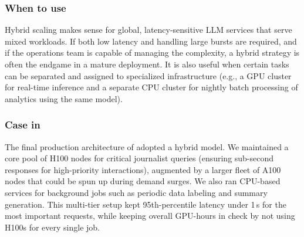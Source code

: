 \subsubsection{When to use}
Hybrid scaling makes sense for global, latency-sensitive LLM services that serve mixed workloads. If both low latency and handling large bursts are required, and if the operations team is capable of managing the complexity, a hybrid strategy is often the endgame in a mature deployment. It is also useful when certain tasks can be separated and assigned to specialized infrastructure (e.g., a GPU cluster for real-time inference and a separate CPU cluster for nightly batch processing of analytics using the same model).

\subsubsection{Case in \ishtar{}}
The final production architecture of \ishtar{} adopted a hybrid model. We maintained a core pool of H100 nodes for critical journalist queries (ensuring sub-second responses for high-priority interactions), augmented by a larger fleet of A100 nodes that could be spun up during demand surges. We also ran CPU-based services for background jobs such as periodic data labeling and summary generation. This multi-tier setup kept 95th-percentile latency under 1\,s for the most important requests, while keeping overall GPU-hours in check by not using H100s for every single job.

